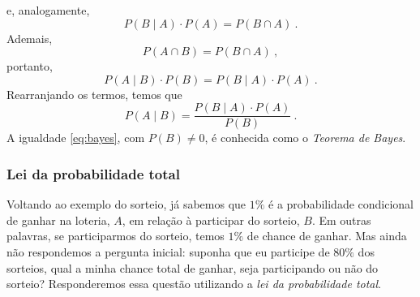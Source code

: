 \documentclass{article}
\begin{document}
            e, analogamente,
            \begin{equation*}
                P(B \mid A) \cdot P(A) = P(B \cap A)\ .
            \end{equation*}
            Ademais,
            \begin{equation*}
                P(A \cap B) = P(B \cap A)\ ,
            \end{equation*}
            portanto,
            \begin{equation*}
                P(A \mid B) \cdot P(B) = P(B \mid A) \cdot P(A)\ .
            \end{equation*}
            Rearranjando os termos, temos que
            \begin{equation}
            \label{eq:bayes}
                P(A \mid B) = \frac{P(B \mid A) \cdot P(A)}{P(B)}\ .
            \end{equation}
            A igualdade \eqref{eq:bayes}, com $P(B) \neq 0$, é conhecida como o \emph{Teorema de Bayes}.
            
            
            
                
            \subsubsection{Lei da probabilidade total}
            
                Voltando ao exemplo do sorteio, já sabemos que $1\%$ é a probabilidade condicional de ganhar na loteria, $A$, em relação à participar do sorteio, $B$.
                Em outras palavras, se participarmos do sorteio, temos $1\%$ de chance de ganhar.
                Mas ainda não respondemos a pergunta inicial: suponha que eu participe de $80\%$ dos sorteios, qual a minha chance total de ganhar, seja participando ou não do sorteio?
                Responderemos essa questão utilizando a \emph{lei da probabilidade total}.
                
\end{document}
